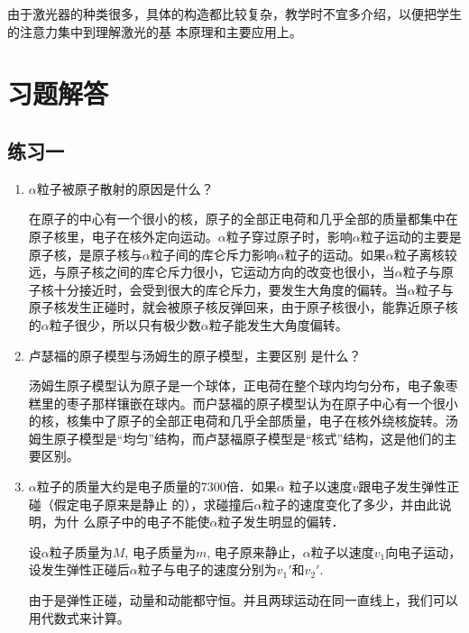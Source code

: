 由于激光器的种类很多，具体的构造都比较复杂，教学时不宜多介绍，以便把学生的注意力集中到理解激光的基
本原理和主要应用上。

\section{习题解答}

\subsection{练习一}
\begin{enumerate}
    \item $\alpha$粒子被原子散射的原因是什么？

\begin{solution}
在原子的中心有一个很小的核，原子的全部正电荷和几乎全部的质量都集中在原子核里，电子在核外定向运动。$\alpha$粒子穿过原子时，影响$\alpha$粒子运动的主要是原子核，是原子核与$\alpha$粒子间的库仑斥力影响$\alpha$粒子的运动。如果$\alpha$粒子离核较远，与原子核之间的库仑斥力很小，它运动方向的改变也很小，当$\alpha$粒子与原子核十分接近时，会受到很大的库仑斥力，要发生大角度的偏转。当$\alpha$粒子与原子核发生正碰时，就会被原子核反弹回来，由于原子核很小，能靠近原子核的$\alpha$粒子很少，所以只有极少数$\alpha$粒子能发生大角度偏转。    
\end{solution}
    \item 卢瑟福的原子模型与汤姆生的原子模型，主要区别
    是什么？

    \begin{solution}
汤姆生原子模型认为原子是一个球体，正电荷在整个球内均匀分布，电子象枣糕里的枣子那样镶嵌在球内。而户瑟福的原子模型认为在原子中心有一个很小的核，核集中了原子的全部正电荷和几乎全部质量，电子在核外绕核旋转。汤姆生原子模型是“均匀”结构，而卢瑟福原子模型是“核式”结构，这是他们的主要区别。        
    \end{solution}
    \item $\alpha$粒子的质量大约是电子质量的7300倍．如果$\alpha$
    粒子以速度$v$跟电子发生弹性正碰（假定电子原来是静止
    的），求碰撞后$\alpha$粒子的速度变化了多少，并由此说明，为什
    么原子中的电子不能使$\alpha$粒子发生明显的偏转．

    \begin{solution}
设$\alpha$粒子质量为$M$, 电子质量为$m$, 电子原来静止，$\alpha$粒子以速度$v_1$向电子运动，设发生弹性正碰后$\alpha$粒子与电子的速度分别为$v_1'$和$v_2'$.

由于是弹性正碰，动量和动能都守恒。并且两球运动在同一直线上，我们可以用代数式来计算。


\end{solution}
\end{enumerate}
